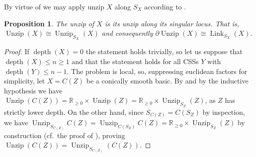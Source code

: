 \documentclass[11pt]{amsart}
\newcommand{\mbb}[1]{\mathbb{#1}}
\newcommand{\R}{\mbb{R}}
\DeclareMathOperator{\Unzip}{Unzip}
\DeclareMathOperator{\Link}{Link}
\DeclareMathOperator{\depth}{depth}
\numberwithin{equation}{section}
\theoremstyle{definition}
\theoremstyle{remark}
\theoremstyle{plain}
\newtheorem{proposition}[equation]{Proposition}
\newtheorem{lemma}[equation]{Lemma}
\begin{document}
By virtue of  we may apply unzip $X$ along $S_X$ according to \cite[Proposition 7.3.10]{ayala2017local}.

\begin{proposition}\label{7GBVGBA}
    The unzip of $X$ is its unzip along its singular locus. That is, $\Unzip(X)\cong\Unzip_{S_X}(X)$ and consequently $\partial\Unzip(X)\cong\Link_{S_X}(X)$.
\end{proposition}
\begin{proof}
    If $\depth(X)=0$ the statement holds trivially, so let us suppose that $\depth(X)\leq n\geq1$ and that the statement holds for all CSSs $Y$ with $\depth(Y)\leq n-1$.
    The problem is local, so, suppressing euclidean factors for simplicity, let $X=C(Z)$ be a conically smooth basic. By \cite[Lemma 7.3.5, (5) and (6)]{ayala2017local} and by the inductive hypothesis we have $\Unzip(C(Z))=\R_{\geq0}\times\Unzip(Z)=\R_{\geq0}\times\Unzip_{S_Z}(Z)$, as $Z$ has strictly lower depth. On the other hand, since $S_{C(Z)}=C(S_Z)$ by inspection, we have $\Unzip_{S_{C(Z)}}C(Z)=\Unzip_{C(S_Z)}C(Z)=\R_{\geq0}\times\Unzip_{S_Z}(Z)$ by construction (cf.\ the proof of \cite[Proposition 7.3.10]{ayala2017local}), proving $\Unzip(C(Z))=\Unzip_{S_{C(Z)}}(C(Z))$.
\end{proof}


\end{document}
